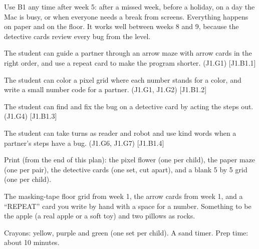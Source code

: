 
\begin{teachernote}
Use B1 any time after week 5: after a missed week, before a holiday, on a day the Mac is busy, or when everyone needs a break from screens. Everything happens on paper and on the floor. It works well between weeks 8 and 9, because the detective cards review every bug from the level.
\end{teachernote}

\begin{objectives}
  \item The student can guide a partner through an arrow maze with arrow cards in the right order, and use a repeat card to make the program shorter. (J1.G1) [J1.B1.1]
  \item The student can color a pixel grid where each number stands for a color, and write a small number code for a partner. (J1.G1, J1.G2) [J1.B1.2]
  \item The student can find and fix the bug on a detective card by acting the steps out. (J1.G4) [J1.B1.3]
  \item The student can take turns as reader and robot and use kind words when a partner's steps have a bug. (J1.G6, J1.G7) [J1.B1.4]
\end{objectives}

\begin{materials}
  \item Print (from the end of this plan): the pixel flower (one per child), the paper maze (one per pair), the detective cards (one set, cut apart), and a blank 5 by 5 grid (one per child).
  \item The masking-tape floor grid from week 1, the arrow cards from week 1, and a \enquote{REPEAT} card you write by hand with a space for a number. Something to be the apple (a real apple or a soft toy) and two pillows as rocks.
  \item Crayons: yellow, purple and green (one set per child). A sand timer. Prep time: about 10 minutes.
\end{materials}

